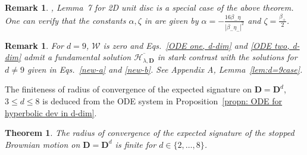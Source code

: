 \documentclass[11pt,a4paper,english,reqno]{amsart}
\theoremstyle{plain}
\newtheorem{theorem}[definition]{Theorem}
\newtheorem{remark}[definition]{Remark}
\newcommand{\1}{\mathbbm{1}}
\begin{document}
\begin{remark}
\cite{boedihardjo2021expected}, Lemma~7 for 2D unit disc is a special case of the above theorem. One can verify that the constants $\alpha,\zeta$ in \cite{boedihardjo2021expected} are given by $\alpha = -\frac{16\beta_{-}\eta_{-}}{\left|\beta_{-}\eta_{-}\right|^2} $ and $\zeta = \frac{\beta_{+}}{2}$.
\end{remark}

\begin{remark}
For $d = 9$, $\mathcal{W}$ is zero and Eqs.~\eqref{ODE one, d-dim} and \eqref{ODE two, d-dim} admit a fundamental solution $\overline{\mathcal{H}_{\lambda, \mathbf{D}}}$ in stark contrast with the solutions for $d \neq 9$ given in Eqs.~\eqref{new-a} and \eqref{new-b}. See Appendix A, Lemma~\ref{lem:d=9case}.
\end{remark}


The finiteness of  radius of convergence of the expected signature on $\mathbf{D}=\mathbf{D}^d$, $3\leq d \leq 8$ is deduced from the ODE system in Proposition~\ref{propn: ODE for hyperbolic dev in d-dim}.


\begin{theorem}\label{thm: d-dim, finite ROC}
The radius of convergence of the expected signature of the stopped Brownian motion  on $\mathbf{D}=\mathbf{D}^d$ is finite for $d \in \{2, \ldots,8\}$.
\end{theorem}
\end{document}
